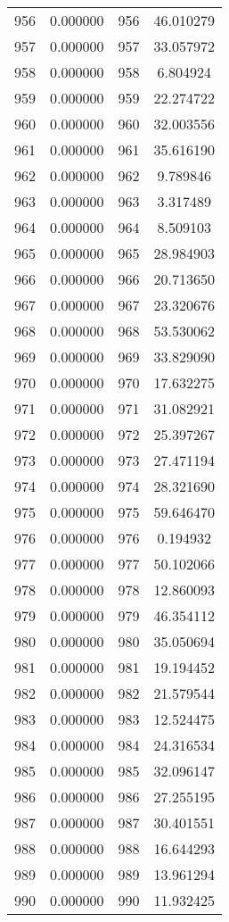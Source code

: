 \documentclass[12pt]{article}
\begin{document}
\begin{longtable}{@{}cccc@{}}
956 & 0.000000 & 956 & 46.010279 \\
957 & 0.000000 & 957 & 33.057972 \\
958 & 0.000000 & 958 & 6.804924 \\
959 & 0.000000 & 959 & 22.274722 \\
960 & 0.000000 & 960 & 32.003556 \\
961 & 0.000000 & 961 & 35.616190 \\
962 & 0.000000 & 962 & 9.789846 \\
963 & 0.000000 & 963 & 3.317489 \\
964 & 0.000000 & 964 & 8.509103 \\
965 & 0.000000 & 965 & 28.984903 \\
966 & 0.000000 & 966 & 20.713650 \\
967 & 0.000000 & 967 & 23.320676 \\
968 & 0.000000 & 968 & 53.530062 \\
969 & 0.000000 & 969 & 33.829090 \\
970 & 0.000000 & 970 & 17.632275 \\
971 & 0.000000 & 971 & 31.082921 \\
972 & 0.000000 & 972 & 25.397267 \\
973 & 0.000000 & 973 & 27.471194 \\
974 & 0.000000 & 974 & 28.321690 \\
975 & 0.000000 & 975 & 59.646470 \\
976 & 0.000000 & 976 & 0.194932 \\
977 & 0.000000 & 977 & 50.102066 \\
978 & 0.000000 & 978 & 12.860093 \\
979 & 0.000000 & 979 & 46.354112 \\
980 & 0.000000 & 980 & 35.050694 \\
981 & 0.000000 & 981 & 19.194452 \\
982 & 0.000000 & 982 & 21.579544 \\
983 & 0.000000 & 983 & 12.524475 \\
984 & 0.000000 & 984 & 24.316534 \\
985 & 0.000000 & 985 & 32.096147 \\
986 & 0.000000 & 986 & 27.255195 \\
987 & 0.000000 & 987 & 30.401551 \\
988 & 0.000000 & 988 & 16.644293 \\
989 & 0.000000 & 989 & 13.961294 \\
990 & 0.000000 & 990 & 11.932425 \\

\end{longtable}
\end{document}
